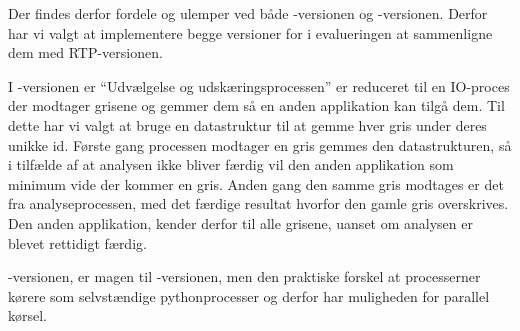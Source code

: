 Der findes derfor fordele og ulemper ved både -versionen og -versionen. Derfor har vi valgt at implementere begge versioner for i evalueringen at sammenligne dem med RTP-versionen.

I -versionen er ``Udvælgelse og udskæringsprocessen'' er reduceret til en IO-proces der modtager grisene og gemmer dem så en anden applikation kan tilgå dem. Til dette har vi valgt at bruge en  datastruktur til at gemme  hver gris under deres unikke id. Første gang processen modtager en gris gemmes den datastrukturen, så i tilfælde af at analysen ikke bliver færdig vil den anden applikation som minimum vide der kommer en gris. Anden gang den samme gris modtages er det fra analyseprocessen, med det færdige resultat hvorfor  den gamle gris overskrives. Den anden applikation, kender derfor til alle grisene, uanset om analysen er blevet rettidigt færdig.

-versionen, er magen til -versionen, men den praktiske forskel at processerner kørere som selvstændige pythonprocesser og derfor har muligheden for parallel kørsel. 



